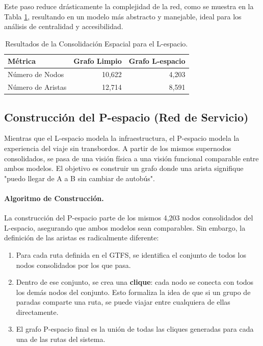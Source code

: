             Este paso reduce drásticamente la complejidad de la red, como se muestra en la Tabla \ref{tab:consolidacion_grafo_lspace}, resultando en un modelo más abstracto y manejable, ideal para los análisis de centralidad y accesibilidad.

            \begin{table}[H]
                \centering
                \caption{Resultados de la Consolidación Espacial para el L-espacio.}
                \label{tab:consolidacion_grafo_lspace}
                \begin{tabular}{lrr}
                    \hline
                    \textbf{Métrica} & \textbf{Grafo Limpio} & \textbf{Grafo L-espacio} \\
                    \hline
                    Número de Nodos & 10,622 & 4,203 \\
                    Número de Aristas & 12,714 & 8,591 \\
                    \hline
                \end{tabular}
            \end{table}

        \subsection{Construcción del P-espacio (Red de Servicio)}
        
            Mientras que el L-espacio modela la infraestructura, el P-espacio modela la experiencia del viaje sin transbordos. A partir de los mismos supernodos consolidados, se pasa de una visión física a una visión funcional comparable entre ambos modelos. El objetivo es construir un grafo donde una arista signifique "puedo llegar de A a B sin cambiar de autobús".

            \paragraph{Algoritmo de Construcción.}
            La construcción del P-espacio parte de los mismos 4,203 nodos consolidados del L-espacio, asegurando que ambos modelos sean comparables. Sin embargo, la definición de las aristas es radicalmente diferente:
            \begin{enumerate}
                \item Para cada ruta definida en el GTFS, se identifica el conjunto de todos los nodos consolidados por los que pasa.
                \item Dentro de ese conjunto, se crea una \textbf{clique}: cada nodo se conecta con todos los demás nodos del conjunto. Esto formaliza la idea de que si un grupo de paradas comparte una ruta, se puede viajar entre cualquiera de ellas directamente.
                \item El grafo P-espacio final es la unión de todas las cliques generadas para cada una de las rutas del sistema.
            \end{enumerate}

